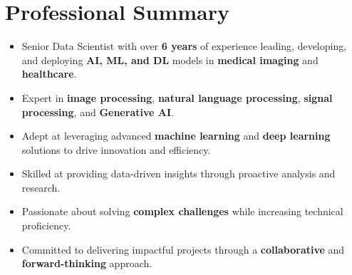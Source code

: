 \section{\textbf{Professional Summary}}
\begin{itemize}
    \small
    \setlength{\itemsep}{0pt}
    \setlength{\parskip}{0pt}
    \setlength{\parsep}{0pt}
    \item Senior Data Scientist with over \textbf{6 years} of experience leading, developing,
          and deploying \textbf{AI, ML, and DL} models in \textbf{medical imaging} and \textbf{healthcare}.
    \item Expert in \textbf{image processing}, \textbf{natural language processing}, \textbf{signal processing}, and
          \textbf{Generative AI}.
    \item Adept at leveraging advanced \textbf{machine learning} and \textbf{deep learning} solutions
          to drive innovation and efficiency.
    \item Skilled at providing data-driven insights through proactive analysis and research.
    \item Passionate about solving \textbf{complex challenges} while increasing technical proficiency.
    \item Committed to delivering impactful projects through a \textbf{collaborative} and \textbf{forward-thinking} approach.
\end{itemize}